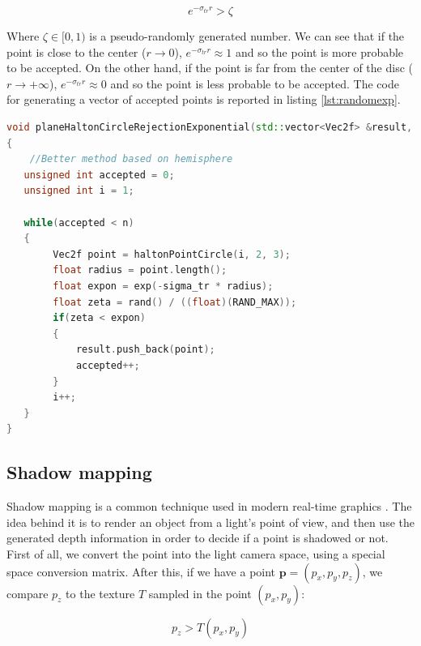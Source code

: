 $$
e^{-\sigma_{tr} r} > \zeta
$$

Where $\zeta \in [0,1)$ is a pseudo-randomly generated number. We can see that if the point is close to the center ($r \rightarrow 0$), $e^{-\sigma_{tr} r} \approx 1$ and so the point is more probable to be accepted. On the other hand, if the point is far from the center of the disc ($r \rightarrow +\infty$), $e^{-\sigma_{tr} r} \approx 0$ and so the point is less probable to be accepted. The code for generating a vector of accepted points is reported in listing \ref{lst:randomexp}.

\begin{lstlisting}[language=C++,label=lst:randomexp,caption={Generation by rejection of a exponentially distributed disc.}]
void planeHaltonCircleRejectionExponential(std::vector<Vec2f> &result, int n, float sigma_tr)
{
    //Better method based on hemisphere
   unsigned int accepted = 0;
   unsigned int i = 1;
	
   while(accepted < n)
   {
        Vec2f point = haltonPointCircle(i, 2, 3);
        float radius = point.length();
        float expon = exp(-sigma_tr * radius);
        float zeta = rand() / ((float)(RAND_MAX));
        if(zeta < expon)
        {
            result.push_back(point);
            accepted++;
        }
        i++;
   }
}
\end{lstlisting}

\subsection{Shadow mapping}
\label{ref:shadow_map}
Shadow mapping is a common technique used in modern real-time graphics \citep{everitt,Segal:1992:FSL:142920.134071,williams1978a}. The idea behind it is to render an object from a light's point of view, and then use the generated depth information in order to decide if a point is shadowed or not. First of all, we convert the point into the light camera space, using a special space conversion matrix. After this, if we have a point $\mathbf{p} = (p_x,p_y,p_z)$, we compare $p_z$ to the texture $T$ sampled in the point $(p_x,p_y)$:

$$
p_z > T(p_x,p_y)
\label{eq:shadowtest}
$$ 

